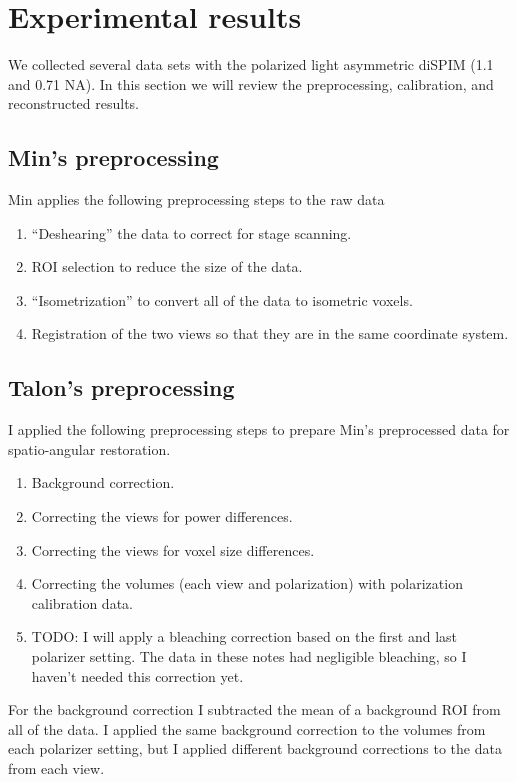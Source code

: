 \documentclass[11pt]{article}
\begin{document}
\section{Experimental results} \label{sec:exp}

We collected several data sets with the polarized light asymmetric diSPIM (1.1
and 0.71 NA). In this section we will review the preprocessing, calibration, and
reconstructed results.

\subsection{Min's preprocessing}
Min applies the following preprocessing steps to the raw data
\begin{enumerate}
\item ``Deshearing'' the data to correct for stage scanning.
\item ROI selection to reduce the size of the data.
\item ``Isometrization'' to convert all of the data to isometric voxels.
\item Registration of the two views so that they are in the same coordinate
  system.
\end{enumerate}

\subsection{Talon's preprocessing}
I applied the following preprocessing steps to prepare Min's preprocessed data for
spatio-angular restoration.
\begin{enumerate}
\item Background correction.
\item Correcting the views for power differences.
\item Correcting the views for voxel size differences.
\item Correcting the volumes (each view and polarization) with polarization
  calibration data.
\item TODO: I will apply a bleaching correction based on the first and last
  polarizer setting. The data in these notes had negligible bleaching, so I
  haven't needed this correction yet.
\end{enumerate}

For the background correction I subtracted the mean of a background ROI from all
of the data. I applied the same background correction to the volumes from each
polarizer setting, but I applied different background corrections to the data
from each view.
\end{document}
